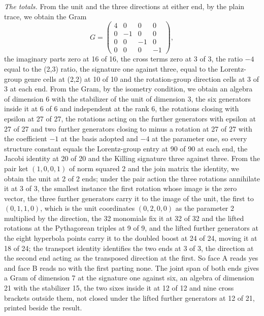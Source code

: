 \begin{chproof}
\textit{The totals.} From the unit and the three directions at either end, by the plain trace, we obtain the Gram
\begin{equation}
G = \begin{pmatrix} 4 & 0 & 0 & 0 \\ 0 & -1 & 0 & 0 \\ 0 & 0 & -1 & 0 \\ 0 & 0 & 0 & -1 \end{pmatrix},
\end{equation}
the imaginary parts zero at 16 of 16, the cross terms zero at 3 of 3, the ratio $-4$ equal to the (2,3) ratio, the signature one against three, equal to the Lorentz-group genre cells at (2,2) at 10 of 10 and the rotation-group direction cells at 3 of 3 at each end. From the Gram, by the isometry condition, we obtain an algebra of dimension 6 with the stabilizer of the unit of dimension 3, the six generators inside it at 6 of 6 and independent at the rank 6, the rotations closing with epsilon at 27 of 27, the rotations acting on the further generators with epsilon at 27 of 27 and two further generators closing to minus a rotation at 27 of 27 with the coefficient $-1$ at the basis adopted and $-4$ at the parameter one, so every structure constant equals the Lorentz-group entry at 90 of 90 at each end, the Jacobi identity at 20 of 20 and the Killing signature three against three. From the pair ket $(1,0,0,1)$ of norm squared 2 and the join matrix the identity, we obtain the unit at 2 of 2 ends; under the pair action the three rotations annihilate it at 3 of 3, the smallest instance the first rotation whose image is the zero vector, the three further generators carry it to the image of the unit, the first to $(0,1,1,0)$, which is the unit coordinates $(0,2,0,0)$ as the parameter 2 multiplied by the direction, the 32 monomials fix it at 32 of 32 and the lifted rotations at the Pythagorean triples at 9 of 9, and the lifted further generators at the eight hyperbola points carry it to the doubled boost at 24 of 24, moving it at 18 of 24; the transport identity identifies the two ends at 3 of 3, the direction at the second end acting as the transposed direction at the first. So face A reads yes and face B reads no with the first parting none. The joint span of both ends gives a Gram of dimension 7 at the signature one against six, an algebra of dimension 21 with the stabilizer 15, the two sixes inside it at 12 of 12 and nine cross brackets outside them, not closed under the lifted further generators at 12 of 21, printed beside the result.


\end{chproof}
